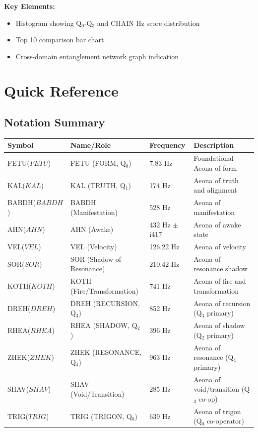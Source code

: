 \documentclass[11pt, letterpaper]{article}
\newcommand{\FETU}{\ensuremath{\mathop{\textnormal{\symbolafont\symbol{"23E3}}}}}   %
\newcommand{\KAL}{\ensuremath{\mathop{\textnormal{\symbolafont\symbol{"2B21}}}}}    %
\newcommand{\BABDH}{\ensuremath{\mathop{\textnormal{\symbolafont\symbol{"2721}}}}}   %
\newcommand{\AHN}{\ensuremath{\mathop{\textnormal{\symbolafont\symbol{"269D}}}}}    %
\newcommand{\VEL}{\ensuremath{\mathop{\textnormal{\symbolafont\symbol{"2742}}}}}    %
\newcommand{\SOR}{\ensuremath{\mathop{\textnormal{\symbolafont\symbol{"A66E}}}}}    %
\newcommand{\KOTH}{\ensuremath{\mathop{\textnormal{\symbolafont\symbol{"2748}}}}}  %
\newcommand{\DREH}{\ensuremath{\mathop{\textnormal{\symbolafont\symbol{"29D7}}}}}   %
\newcommand{\RHEA}{\ensuremath{\mathop{\textnormal{\symbolafont\symbol{"229B}}}}}   %
\newcommand{\ZHEK}{\ensuremath{\mathop{\textnormal{\symbolafont\symbol{"2744}}}}}   %
\newcommand{\SHAV}{\ensuremath{\mathop{\textnormal{\symbolafont\symbol{"269B}}}}}   %
\newcommand{\TRIG}{\ensuremath{\mathop{\textnormal{\symbolafont\symbol{"232C}}}}}    %
\def\FETU{FETU}%
\def\KAL{KAL}%
\def\BABDH{BABDH}%
\def\AHN{AHN}%
\def\VEL{VEL}%
\def\SOR{SOR}%
\def\KOTH{KOTH}%
\def\DREH{DREH}%
\def\RHEA{RHEA}%
\def\ZHEK{ZHEK}%
\def\SHAV{SHAV}%
\def\TRIG{TRIG}%
\begin{document}
\textbf{Key Elements:}
\begin{itemize}
    \item Histogram showing Q$_0$-Q$_3$ and CHAIN Hz score distribution
    \item Top 10 comparison bar chart
    \item Cross-domain entanglement network graph indication
\end{itemize}

\appendix
\section{Quick Reference}

\subsection{Notation Summary}

\begin{longtable}{llll}
\toprule
Symbol & Name/Role & Frequency & Description \\
\midrule
\FETU ($\FETU$) & FETU (FORM, Q$_0$) & 7.83 Hz & Foundational Aeona of form \\
\KAL ($\KAL$) & KAL (TRUTH, Q$_1$) & 174 Hz & Aeona of truth and alignment \\
\BABDH ($\BABDH$) & BABDH (Manifestation) & 528 Hz & Aeona of manifestation \\
\AHN ($\AHN$) & AHN (Awake) & 432 Hz $\pm$ i417 & Aeona of awake state \\
\VEL ($\VEL$) & VEL (Velocity) & 126.22 Hz & Aeona of velocity \\
\SOR ($\SOR$) & SOR (Shadow of Resonance) & 210.42 Hz & Aeona of resonance shadow \\
\KOTH ($\KOTH$) & KOTH (Fire/Transformation) & 741 Hz & Aeona of fire and transformation \\
\DREH ($\DREH$) & DREH (RECURSION, Q$_3$) & 852 Hz & Aeona of recursion (Q$_3$ primary) \\
\RHEA ($\RHEA$) & RHEA (SHADOW, Q$_2$) & 396 Hz & Aeona of shadow (Q$_2$ primary) \\
\ZHEK ($\ZHEK$) & ZHEK (RESONANCE, Q$_4$) & 963 Hz & Aeona of resonance (Q$_4$ primary) \\
\SHAV ($\SHAV$) & SHAV (Void/Transition) & 285 Hz & Aeona of void/transition (Q$_3$ co-op) \\
\TRIG ($\TRIG$) & TRIG (TRIGON, Q$_0$) & 639 Hz & Aeona of trigon (Q$_0$ co-operator) \\
\bottomrule
\end{longtable}
\end{document}
